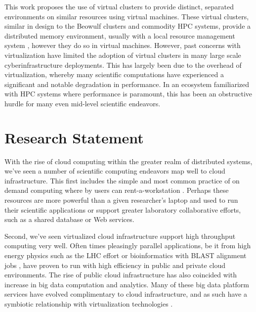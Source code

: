 This work proposes the use of virtual clusters \cite{Foster2006} to provide distinct, separated environments on similar resources using virtual machines. These virtual clusters, similar in design to the Beowulf clusters and commodity HPC systems, provide a distributed memory environment, usually with a local resource management system \cite{czajkowski1998resource}, however they do so in virtual machines.  However, past concerns with virtualization have limited the adoption of virtual clusters in many large scale cyberinfrastructure deployments. This has largely been due to the overhead of virtualization, whereby many scientific computations have experienced a significant and notable degradation in performance.  In an ecosystem familiarized with HPC systems where performance is paramount, this has been an obstructive hurdle for many even mid-level scientific endeavors.

\section{Research Statement}
\label{sec:stmt}


With the rise of cloud computing within the greater realm of distributed systems, we've seen a number of scientific computing endeavors map well to cloud infrastructure. This first includes the simple and most common practice of on demand computing where by users can rent-a-workstation \cite{kondo2009cost}. Perhaps these resources are more powerful than a given researcher's laptop and used to run their scientific applications or support greater laboratory collaborative efforts, such as a shared database or Web services. 

Second, we've seen virtualized cloud infrastructure support high throughput computing very well. Often times pleasingly parallel applications, be it from high energy physics such as the LHC effort \cite{buncic2010cernvm, bell2015scaling} or bioinformatics with BLAST alignment jobs \cite{menon2012cloud}, have proven to run with high efficiency in public and private cloud environments. The rise of public cloud infrastructure has also coincided with increase in big data computation and analytics.  Many of these big data platform services have evolved complimentary to cloud infrastructure, and as such have a symbiotic relationship with virtualization technologies \cite{gunarathne2010mapreduce}.  

